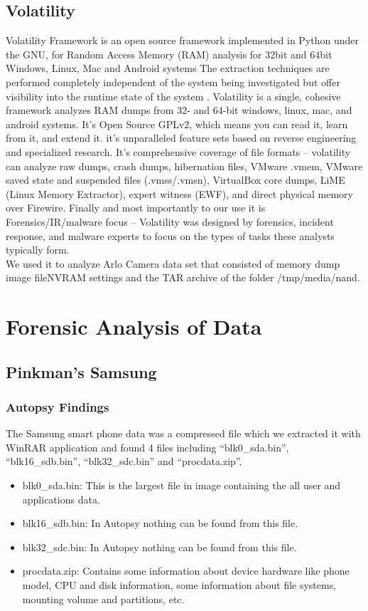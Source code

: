 \documentclass{easychair}
\begin{document}
\subsection{Volatility}
Volatility Framework is an open source framework implemented in Python under the GNU, for Random Access Memory (RAM) analysis for 32bit and 64bit Windows, Linux, Mac and Android systems The extraction techniques are performed completely independent of the system being investigated but offer visibility into the runtime state of the system \cite{Ab_4}\cite{Ab_5}. Volatility is a single, cohesive framework analyzes RAM dumps from 32- and 64-bit windows, linux, mac, and android systems. It’s Open Source GPLv2, which means you can read it, learn from it, and extend it. it's unparalleled feature sets based on reverse engineering and specialized research. It's comprehensive coverage of file formats – volatility can analyze raw dumps, crash dumps, hibernation files, VMware .vmem, VMware saved state and suspended files (.vmss/.vmsn), VirtualBox core dumps, LiME (Linux Memory Extractor), expert witness (EWF), and direct physical memory over Firewire. Finally and most importantly to our use it is Forensics/IR/malware focus – Volatility was designed by forensics, incident response, and malware experts to focus on the types of tasks these analysts typically form. \\ We used it to analyze Arlo Camera data set that consisted of memory dump image fileNVRAM settings and the TAR archive of the folder /tmp/media/nand.


\newpage
\section{Forensic Analysis of Data}


\subsection{Pinkman's Samsung}
 \subsubsection{Autopsy Findings}
 The Samsung smart phone data was a compressed file which we extracted it with WinRAR application and found 4 files including “blk0\_{sda.bin}”, “blk16\_sdb.bin”, “blk32\_sdc.bin” and “procdata.zip”. 

\begin{itemize}
\itemsep-1.9em
\item blk0\_sda.bin: This is the largest file in image containing the all user and applications data.
\item blk16\_sdb.bin: In Autopsy nothing can be found from this file.
\item blk32\_sdc.bin: In Autopsy nothing can be found from this file.
\item procdata.zip: Contains some information about device hardware like phone model, CPU and disk information, some information about file systems, mounting volume and partitions, etc. 
 \end{itemize}
 
\end{document}
